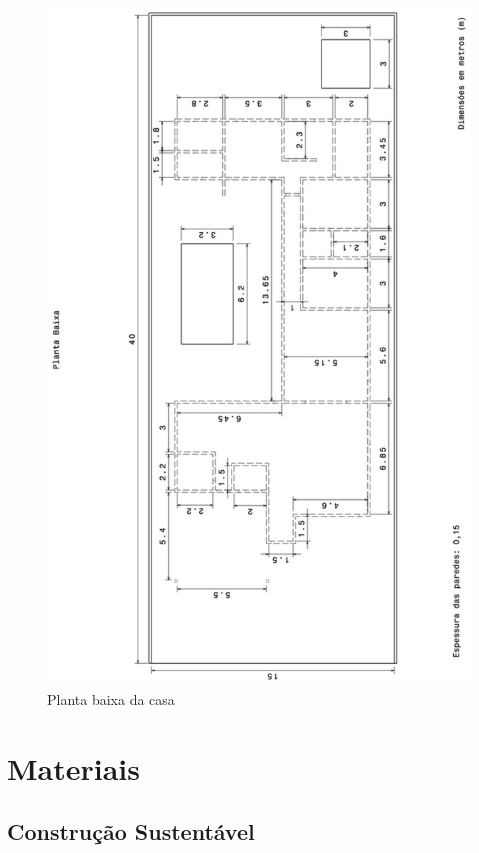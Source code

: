 \begin{figure}[H]
  \begin{center}
	\includegraphics[keepaspectratio,scale=0.4,angle=270]{figuras/planta_baixa.eps}
	\caption{Planta baixa da casa}
  \end{center}
\end{figure}

\section{Materiais}

\subsection{Construção Sustentável}
	

